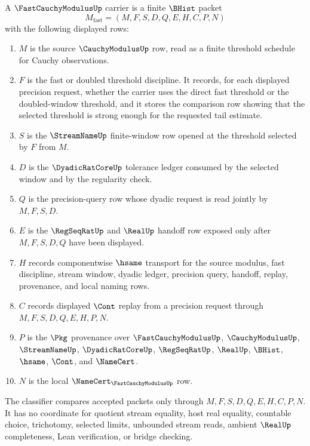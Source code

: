 \begin{definition}
\label{def:fast-cauchy-modulus-carrier}
A $\FastCauchyModulusUp$ carrier is a finite $\BHist$ packet
$$
M_{\mathrm{fast}}=(M,F,S,D,Q,E,H,C,P,N)
$$
with the following displayed rows:
\begin{enumerate}
\item $M$ is the source $\CauchyModulusUp$ row, read as a finite threshold schedule for Cauchy observations.
\item $F$ is the fast or doubled threshold discipline. It records, for each displayed precision request, whether the carrier uses the direct fast threshold or the doubled-window threshold, and it stores the comparison row showing that the selected threshold is strong enough for the requested tail estimate.
\item $S$ is the $\StreamNameUp$ finite-window row opened at the threshold selected by $F$ from $M$.
\item $D$ is the $\DyadicRatCoreUp$ tolerance ledger consumed by the selected window and by the regularity check.
\item $Q$ is the precision-query row whose dyadic request is read jointly by $M,F,S,D$.
\item $E$ is the $\RegSeqRatUp$ and $\RealUp$ handoff row exposed only after $M,F,S,D,Q$ have been displayed.
\item $H$ records componentwise $\hsame$ transport for the source modulus, fast discipline, stream window, dyadic ledger, precision query, handoff, replay, provenance, and local naming rows.
\item $C$ records displayed $\Cont$ replay from a precision request through $M,F,S,D,Q,E,H,P,N$.
\item $P$ is the $\Pkg$ provenance over $\FastCauchyModulusUp$, $\CauchyModulusUp$, $\StreamNameUp$, $\DyadicRatCoreUp$, $\RegSeqRatUp$, $\RealUp$, $\BHist$, $\hsame$, $\Cont$, and $\NameCert$.
\item $N$ is the local $\NameCert_{\FastCauchyModulusUp}$ row.
\end{enumerate}
The classifier compares accepted packets only through $M,F,S,D,Q,E,H,C,P,N$. It has no coordinate for quotient stream equality, host real equality, countable choice, trichotomy, selected limits, unbounded stream reads, ambient $\RealUp$ completeness, Lean verification, or bridge checking.
\end{definition}

